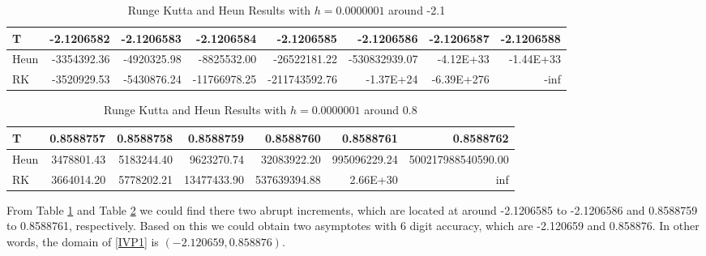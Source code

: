 \documentclass[11pt,a4paper]{article}
\begin{document}
\begin{table}[H]
	\scriptsize
	
	\begin{center}
		\renewcommand{\arraystretch}{1.2} %
		\begin{tabular}{l|r|r|r|r|r|r|r}
			\textbf{T}	&\textbf{-2.1206582}	&\textbf{-2.1206583}	&\textbf{-2.1206584}	&\textbf{-2.1206585}		&\textbf{-2.1206586}	&\textbf{-2.1206587}	&\textbf{-2.1206588}	\\
			\hline
			Heun		&-3354392.36			&-4920325.98			&-8825532.00			&-26522181.22				&-530832939.07			&-4.12E+33				&-1.44E+33				\\
			\hline
			RK			&-3520929.53			&-5430876.24			&-11766978.25			&-211743592.76				&-1.37E+24				&-6.39E+276				&-inf					\\
		\end{tabular}
		\setlength{\abovecaptionskip}{0.1cm}
		\setlength{\belowcaptionskip}{-0.9cm}
		\caption{Runge Kutta and Heun Results with $h=0.0000001$ around -2.1}\label{tab:tab1.2.2.2}
	\end{center}
	
\end{table}

\begin{table}[H]
	\scriptsize
	
	\begin{center}
		\renewcommand{\arraystretch}{1.2} %
		\begin{tabular}{l|r|r|r|r|r|r}
			\textbf{T}	&\textbf{0.8588757}	&\textbf{0.8588758}	&\textbf{0.8588759}	&\textbf{0.8588760}		&\textbf{0.8588761}	&\textbf{0.8588762}	\\
			\hline
			Heun		&3478801.43			&5183244.40			&9623270.74			&32083922.20			&995096229.24		&500217988540590.00	\\
			\hline
			RK			&3664014.20			&5778202.21			&13477433.90		&537639394.88			&2.66E+30			&inf				\\
		\end{tabular}
		\setlength{\abovecaptionskip}{0.1cm}
		\setlength{\belowcaptionskip}{-0.9cm}
		\caption{Runge Kutta and Heun Results with $h=0.0000001$ around 0.8}\label{tab:tab1.2.2.3}
	\end{center}
	
\end{table}
From Table \ref{tab:tab1.2.2.2} and Table \ref{tab:tab1.2.2.3} we could find there two abrupt increments, which are located at around -2.1206585 to -2.1206586 and 0.8588759 to 0.8588761, respectively. Based on this we could obtain two asymptotes with 6 digit accuracy, which are -2.120659 and 0.858876. In other words, the domain of \ref{IVP1} is $(-2.120659, 0.858876)$.
\end{document}
